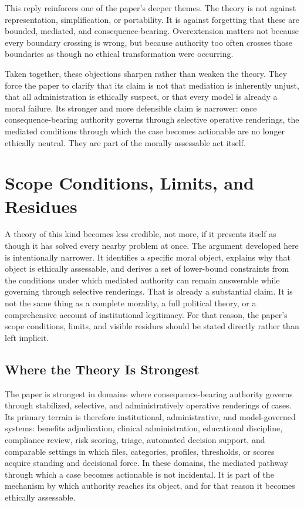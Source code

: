 \documentclass[11pt]{article}
\begin{document}
This reply reinforces one of the paper's deeper themes. The theory is not against representation, simplification, or portability. It is against forgetting that these are bounded, mediated, and consequence-bearing. Overextension matters not because every boundary crossing is wrong, but because authority too often crosses those boundaries as though no ethical transformation were occurring.

Taken together, these objections sharpen rather than weaken the theory. They force the paper to clarify that its claim is not that mediation is inherently unjust, that all administration is ethically suspect, or that every model is already a moral failure. Its stronger and more defensible claim is narrower: once consequence-bearing authority governs through selective operative renderings, the mediated conditions through which the case becomes actionable are no longer ethically neutral. They are part of the morally assessable act itself.
\section{Scope Conditions, Limits, and Residues}

A theory of this kind becomes less credible, not more, if it presents itself as though it has solved every nearby problem at once. The argument developed here is intentionally narrower. It identifies a specific moral object, explains why that object is ethically assessable, and derives a set of lower-bound constraints from the conditions under which mediated authority can remain answerable while governing through selective renderings. That is already a substantial claim. It is not the same thing as a complete morality, a full political theory, or a comprehensive account of institutional legitimacy. For that reason, the paper's scope conditions, limits, and visible residues should be stated directly rather than left implicit.

\subsection{Where the Theory Is Strongest}

The paper is strongest in domains where consequence-bearing authority governs through stabilized, selective, and administratively operative renderings of cases. Its primary terrain is therefore institutional, administrative, and model-governed systems: benefits adjudication, clinical administration, educational discipline, compliance review, risk scoring, triage, automated decision support, and comparable settings in which files, categories, profiles, thresholds, or scores acquire standing and decisional force. In these domains, the mediated pathway through which a case becomes actionable is not incidental. It is part of the mechanism by which authority reaches its object, and for that reason it becomes ethically assessable.
\end{document}
